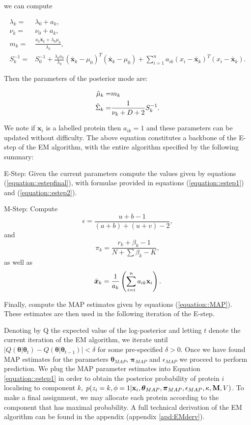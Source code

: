\documentclass[12pt,english]{article}\usepackage[]{graphicx}\usepackage[]{color}
\begin{document}
we can compute

\begin{equation}\label{equation::Posterior}
\begin{split}
\lambda_k = &\lambda_0 + a_k, \\
\nu_k = & \nu_0 + a_k, \\
m_k = & \frac{a_k\bar{\boldsymbol{x}}_k + \lambda_0\mu_0}{\lambda_k},\\
S_k^{-1}  = & S_0^{-1} + \frac{\lambda_0 a_k}{\lambda_k}(\bar{\boldsymbol{x}}_k - \mu_0)^{T} (\bar{\boldsymbol{x}}_k - \mu_0) + \sum_{i=1}^{n} a_{ik}(x_i -\bar{\boldsymbol{x}}_k)^{T}(x_i -\bar{\boldsymbol{x}}_k).
\end{split}
\end{equation}

Then the parameters of the posterior mode are:

\begin{equation}\label{equation::MAP}
\begin{split}
\hat{{\bf\mu}}_k = &m_k \\
\hat{\Sigma}_k = &\frac{1}{\nu_k + D + 2}S_k^{-1}.
\end{split}
\end{equation}

We note if $\boldsymbol{x}_i$ is a labelled protein then $a_{ik} = 1$
and these parameters can be updated without difficulty.  The above
equation constitutes a backbone of the E-step of the EM algorithm, with
the entire algorithm specified by the following summary:


E-Step: Given the current parameters compute the values given by
equations (\ref{equation::estepfinal}), with formulae provided in
equations (\ref{equation::estep1}) and (\ref{equation::estep2}).

\bigskip

M-Step: Compute
\[\epsilon = \frac{ u + b - 1}{(a+b) + (u+v) - 2},\]
and
\[\pi_k = \frac{r_k + \beta_k - 1}{N + \sum \beta_k - K},\]
as well as
\[\bar{\boldsymbol{x}}_k = \frac{1}{a_k}\left(\sum_{i=i}^{n}a_{ik}{\bf x}_i\right).\]

Finally, compute the MAP estimates given by equations
(\ref{equation::MAP}). These estimates are then used in the following
iteration of the E-step.


Denoting by Q the expected value of the log-posterior and letting $t$
denote the current iteration of the EM algorithm, we iterate until
$\lvert Q(\boldsymbol{\theta}|\boldsymbol{\theta}_{t}) -
Q(\boldsymbol{\theta}|\boldsymbol{\theta}_{t-1})\rvert < \delta$ for
some pre-specified $\delta >0$.  Once we have found MAP estimates for
the parameters $\boldsymbol{\theta}_{MAP}$, $\boldsymbol{\pi}_{MAP}$
and $\epsilon_{MAP}$ we proceed to perform prediction. We plug the MAP
parameter estimates into Equation \eqref{equation::estep1} in order to
obtain the posterior probability of protein $i$ localising to
component $k$,
$p(z_i = k, \phi = 1 | {\bf x}_i, \boldsymbol{\theta}_{MAP},
\boldsymbol{\pi}_{MAP} , \epsilon_{MAP},\kappa, {\bf M}, V)$. To make
a final assignment, we may allocate each protein according to the
component that has maximal probability.  A full technical derivation
of the EM algorithm can be found in the appendix (appendix
\ref{apd:EMderv}).
\end{document}

